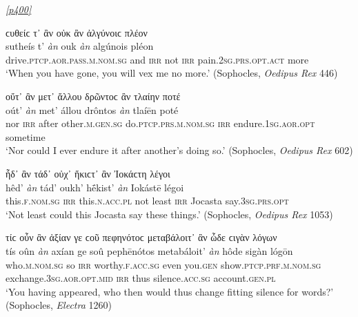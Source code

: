 \hyperlink{p400}{\emph{[p400]}}

\begin{exe}
\ex ϲυθείϲ τ᾽ ἂν οὐκ ἂν ἀλγύνοιϲ πλέον\\
\gll sutheís t' \emph{àn} ouk \emph{àn} algúnois pléon\\
drive.\textsc{ptcp.aor.pass.m.nom.sg} and \textsc{irr} not \textsc{irr} pain.\textsc{2sg.prs.opt.act} more\\
\trans `When you have gone, you will vex me no more.' (Sophocles, \textit{Oedipus Rex} 446)
\label{multian9}
\end{exe}

\begin{exe}
\ex οὔτ᾽ ἂν μετ᾽ ἄλλου δρῶντοϲ ἂν τλαίην ποτέ\\
\gll oút' \emph{àn} met' állou drôntos \emph{àn} tlaíēn poté\\
nor \textsc{irr} after other.\textsc{m.gen.sg} do.\textsc{ptcp.prs.m.nom.sg} \textsc{irr} endure.\textsc{1sg.aor.opt} sometime\\
\trans `Nor could I ever endure it after another's doing so.' (Sophocles, \textit{Oedipus Rex} 602)
\label{multian10}
\end{exe}

\begin{exe}
\ex ἧδ᾽ ἂν τάδ᾽ οὐχ᾽ ἥκιϲτ᾽ ἂν Ἰοκάϲτη λέγοι\\
\gll hêd' \emph{àn} tád' oukh' hḗkist' \emph{àn} Iokástē légoi\\
this.\textsc{f.nom.sg} \textsc{irr} this.\textsc{n.acc.pl} not least \textsc{irr} Jocasta say.\textsc{3sg.prs.opt}\\
\trans `Not least could this Jocasta say these things.' (Sophocles, \textit{Oedipus Rex} 1053)
\label{multian11}
\end{exe}

\begin{exe}
\ex τίϲ οὖν ἂν ἀξίαν γε ϲοῦ πεφηνότοϲ μεταβάλοιτ᾽ ἂν ὧδε ϲιγὰν λόγων\\
\gll tís oûn \emph{àn} axían ge soû pephēnótos metabáloit' \emph{àn} hôde sigàn lógōn\\
who.\textsc{m.nom.sg} so \textsc{irr} worthy.\textsc{f.acc.sg} even you.\textsc{gen} show.\textsc{ptcp.prf.m.nom.sg} exchange.\textsc{3sg.aor.opt.mid} \textsc{irr} thus silence.\textsc{acc.sg} account.\textsc{gen.pl}\\
\trans `You having appeared, who then would thus change fitting silence for words?' (Sophocles, \textit{Electra} 1260)
\label{multian12}
\end{exe}

